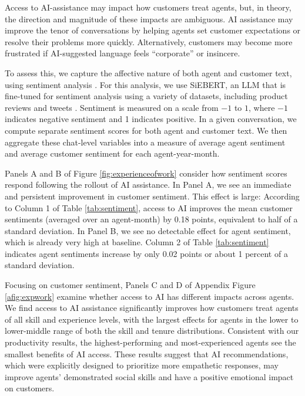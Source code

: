 \documentclass[11pt]{article}
\begin{document}
Access to AI-assistance may impact how customers treat agents, but, in theory, the direction and magnitude of these impacts are ambiguous.  AI assistance may improve the tenor of conversations by helping agents set customer expectations or resolve their problems more quickly.  Alternatively, customers may become more frustrated if AI-suggested language feels ``corporate'' or insincere.  

To assess this, we capture the affective nature of both agent and customer text, using sentiment analysis \citep{mejovaSentimentAnalysisOverview}. For this analysis, we use SiEBERT, an LLM that is fine-tuned for sentiment analysis using a variety of datasets, including product reviews and tweets \citep{hartmann2023}.  Sentiment is measured on a scale from $-1$ to $1$, where $-1$ indicates negative sentiment and 1 indicates positive.  In a given conversation, we compute separate sentiment scores for both agent and customer text.  We then aggregate these chat-level variables into a measure of average agent sentiment and average customer sentiment for each agent-year-month.

Panels A and B of Figure \ref{fig:experienceofwork} consider how sentiment scores respond following the rollout of AI assistance.  In Panel A, we see an immediate and persistent improvement in customer sentiment.  This effect is large: According to Column 1 of Table \ref{tab:sentiment}, access to AI improves the mean customer sentiments (averaged over an agent-month) by 0.18 points, equivalent to half of a standard deviation.  In Panel B, we see no detectable effect for agent sentiment, which is already very high at baseline.  Column 2 of Table \ref{tab:sentiment} indicates agent sentiments increase by only 0.02 points or about 1 percent of a standard deviation. 

Focusing on customer sentiment, Panels C and D of Appendix Figure \ref{afig:expwork} examine whether access to AI has different impacts across agents.  We find access to AI assistance significantly improves how customers treat agents of all skill and experience levels, with the largest effects for agents in the lower to lower-middle range of both the skill and tenure distributions.  Consistent with our productivity results, the highest-performing and most-experienced agents see the smallest benefits of AI access.  These results suggest that AI recommendations, which were explicitly designed to prioritize more empathetic responses, may improve agents' demonstrated social skills and have a positive emotional impact on customers.  
\end{document}
